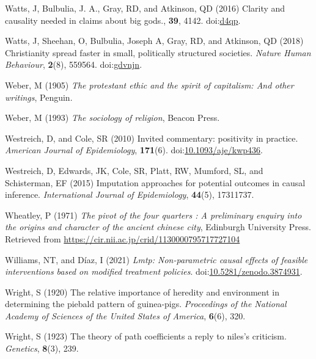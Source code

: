 \documentclass[
  singlecolumn,
  9pt]{article}
\newlength{\cslhangindent}
\newenvironment{CSLReferences}[2] %
 {\begin{list}{}{%
  \setlength{\itemindent}{0pt}
  \setlength{\leftmargin}{0pt}
  \setlength{\parsep}{0pt}
  \ifodd #1
   \setlength{\leftmargin}{\cslhangindent}
   \setlength{\itemindent}{-1\cslhangindent}
  \fi
  \setlength{\itemsep}{#2\baselineskip}}}
 {\end{list}}
\begin{document}
\begin{CSLReferences}{1}{0}
Watts, J, Bulbulia, J. A., Gray, RD, and Atkinson, QD (2016) Clarity and
causality needed in claims about big gods., \textbf{39}, 4142.
doi:\href{https://doi.org/d4qp}{d4qp}.

Watts, J, Sheehan, O, Bulbulia, Joseph A, Gray, RD, and Atkinson, QD
(2018) Christianity spread faster in small, politically structured
societies. \emph{Nature Human Behaviour}, \textbf{2}(8), 559564.
doi:\href{https://doi.org/gdvnjn}{gdvnjn}.

Weber, M (1905) \emph{The protestant ethic and the spirit of capitalism:
And other writings}, Penguin.

Weber, M (1993) \emph{The sociology of religion}, Beacon Press.

Westreich, D, and Cole, SR (2010) Invited commentary: positivity in
practice. \emph{American Journal of Epidemiology}, \textbf{171}(6).
doi:\href{https://doi.org/10.1093/aje/kwp436}{10.1093/aje/kwp436}.

Westreich, D, Edwards, JK, Cole, SR, Platt, RW, Mumford, SL, and
Schisterman, EF (2015) Imputation approaches for potential outcomes in
causal inference. \emph{International Journal of Epidemiology},
\textbf{44}(5), 17311737.

Wheatley, P (1971) \emph{The pivot of the four quarters : A preliminary
enquiry into the origins and character of the ancient chinese city},
Edinburgh University Press. Retrieved from
\url{https://cir.nii.ac.jp/crid/1130000795717727104}

Williams, NT, and Díaz, I (2021) \emph{Lmtp: Non-parametric causal
effects of feasible interventions based on modified treatment policies}.
doi:\href{https://doi.org/10.5281/zenodo.3874931}{10.5281/zenodo.3874931}.

Wright, S (1920) The relative importance of heredity and environment in
determining the piebald pattern of guinea-pigs. \emph{Proceedings of the
National Academy of Sciences of the United States of America},
\textbf{6}(6), 320.

Wright, S (1923) The theory of path coefficients a reply to niles's
criticism. \emph{Genetics}, \textbf{8}(3), 239.

\end{CSLReferences}
\end{document}
